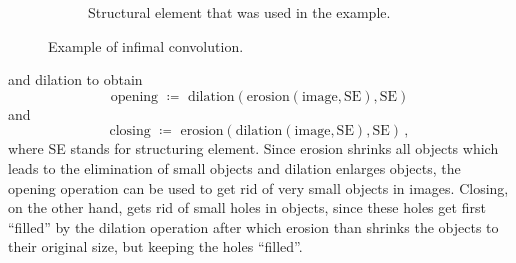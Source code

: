 \begin{figure}[htpb]
\begin{subfigure}[b]{0.3\textwidth}
    \caption{Structural element that was used in the example.}
  \end{subfigure}%
  \label{fig:tropconv}%
  \caption{Example of infimal convolution.}%
\end{figure}
and dilation to obtain
\begin{equation*}
  \text{opening } \coloneqq \text{ dilation}(\text{erosion}(\text{image},\text{SE}),\text{SE}) 
\end{equation*}
and
\begin{equation*}
  \text{closing } \coloneqq \text{ erosion}(\text{dilation}(\text{image},\text{SE}),\text{SE})\,,
\end{equation*}
where SE stands for structuring element. Since erosion shrinks all objects which
leads to the elimination of small objects and dilation enlarges objects, the
opening operation can be used to get rid of very small objects in
images. Closing, on the other hand, gets rid of small holes in objects, since
these holes get first ``filled'' by the dilation operation after which erosion
than shrinks the objects to their original size, but keeping the holes
``filled''.

